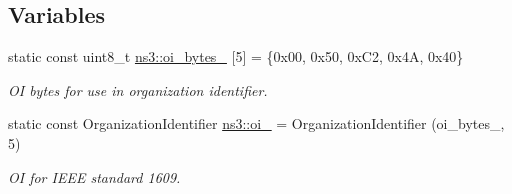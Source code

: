 \subsection*{Variables}
\begin{DoxyCompactItemize}
\item 
static const uint8\+\_\+t \hyperlink{namespacens3_a87242dd5097099a4af8145313b59922c}{ns3\+::oi\+\_\+bytes\+\_} \mbox{[}5\mbox{]} = \{0x00, 0x50, 0x\+C2, 0x4\+A, 0x40\}
\begin{DoxyCompactList}\small\item\em OI bytes for use in organization identifier. \end{DoxyCompactList}\item 
static const Organization\+Identifier \hyperlink{namespacens3_a5bafcf217bb35178539e621dc8ba0aa2}{ns3\+::oi\+\_} = Organization\+Identifier (oi\+\_\+bytes\+\_, 5)
\begin{DoxyCompactList}\small\item\em OI for I\+E\+EE standard 1609. \end{DoxyCompactList}\end{DoxyCompactItemize}
